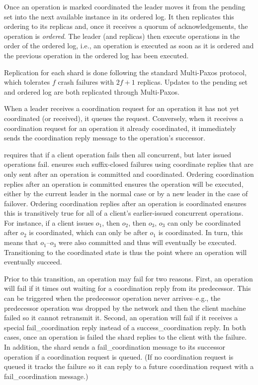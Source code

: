 Once an operation is marked coordinated the leader moves it from the pending set
into the next available instance in its ordered log.  It then replicates this
ordering to its replicas and, once it receives a quorum of acknowledgements, the
operation is \textit{ordered}.
The leader (and replicas) then execute operations in the order of the ordered log, i.e., an operation is executed as soon as it is ordered and the previous operation in the ordered log has been executed.

Replication for each shard is done following the standard Multi-Paxos protocol, which tolerates $f$ crash failures with $2f+1$ replicas.
Updates to the pending set and ordered log are both replicated through Multi-Paxos.

When a leader receives a coordination request for an operation it has not yet coordinated (or received), it queues the request.
Conversely, when it receives a coordination request for an operation it already coordinated, it immediately sends the coordination reply message to the operation's successor.

\Mdl{} requires that if a client operation fails then all concurrent, but later issued operations fail.
\sys{} ensures such suffix-closed failures using coordinate replies that are only sent after an operation is committed and coordinated.
Ordering coordination replies after an operation is committed ensures the operation will be executed, either by the current leader in the normal case or by a new leader in the case of failover.
Ordering coordination replies after an operation is coordinated ensures this is transitively true for all of a client's earlier-issued concurrent operations.
For instance, if a client issues $o_1$, then $o_2$, then $o_3$, $o_3$ can only be coordinated after $o_2$ is coordinated, which can only be after $o_1$ is coordinated.
In turn, this means that $o_1$--$o_3$ were also committed and thus will eventually be executed.
Transitioning to the coordinated state is thus the point where an operation will eventually succeed.

Prior to this transition, an operation may fail for two reasons.
First, an operation will fail if it times out waiting for a coordination reply from its predecessor.
This can be triggered when the predecessor operation never arrives--e.g., the predecessor operation was dropped by the network and then the client machine failed so it cannot retransmit it.
Second, an operation will fail if it receives a special fail\_coordination reply instead of a success\_coordination reply.
In both cases, once an operation is failed the shard replies to the client with the failure.
In addition, the shard sends a fail\_coordination message to its successor operation if a coordination request is queued.
(If no coordination request is queued it tracks the failure so it can reply to a future coordination request with a fail\_coordination message.)



